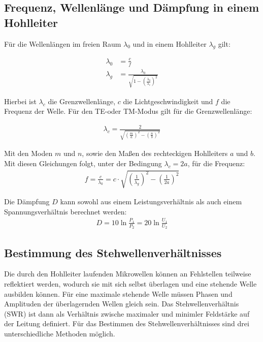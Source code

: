 \subsection{Frequenz, Wellenlänge und Dämpfung in einem Hohlleiter}
Für die Wellenlängen im freien Raum $\lambda_0$ und in einem Hohlleiter $\lambda_g$ gilt:

\begin{align}
  \lambda_0 &= \frac{c}{f} \\
  \lambda_g &= \frac{\lambda_0}{\sqrt{1- \left( \frac{\lambda_0}{\lambda_c} \right)^2}}
\end{align}

Hierbei ist $\lambda_c$ die Grenzwellenlänge, $c$ die Lichtgeschwindigkeit und $f$
die Frequenz der Welle. Für den TE-oder TM-Modus gilt für die
Grenzwellenlänge:

\begin{align}
  \lambda_c = \frac{2}{\sqrt{\left(\frac{m}{a} \right)^2 - \left(\frac{n}{b} \right)^2}}
\end{align}

Mit den Moden $m$ und $n$, sowie den Maßen des rechteckigen Hohlleiters $a$ und $b$.
Mit diesen Gleichungen folgt, unter der Bedingung $\lambda_c=2a$, für die Frequenz:
\begin{align}
  f = \frac{c}{\lambda_0} = c \cdot \sqrt{\left(\frac{1}{\lambda_g}\right)^2 - \left(\frac{1}{2a}\right)^2}
\end{align}


Die Dämpfung $D$ kann sowohl aus einem Leistungsverhältnis als auch einem Spannungsverhältnis berechnet werden:
\begin{align}
  D = 10  \ln{\frac{P_1}{P_2}} = 20 \ln{\frac{U_1}{U_2}}
\end{align}


\subsection{Bestimmung des Stehwellenverhältnisses}
Die durch den Hohlleiter laufenden Mikrowellen können an Fehlstellen teilweise reflektiert
werden, wodurch sie mit sich selbst überlagen und eine stehende Welle ausbilden können.
Für eine maximale stehende Welle müssen Phasen und Amplituden der überlagernden Wellen
gleich sein. Das Stehwellenverhältnis (SWR) ist dann als Verhältnis zwische maximaler
und minimler Feldstärke auf der Leitung definiert. Für das Bestimmen des Stehwellenverhältnisses
sind drei unterschiedliche Methoden möglich.

